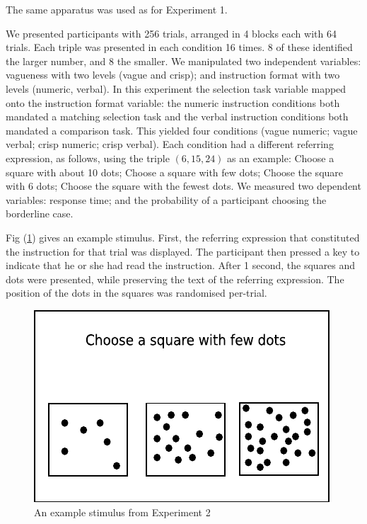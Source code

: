 \documentclass[
a4paper 
, doc
, longtable
]{apa6}
\begin{document}
The same apparatus was used as for Experiment 1.

We presented participants with 256 trials, arranged in 4 blocks each with 64 trials. Each triple was presented in each condition 16 times. 8 of these identified the larger number, and 8 the smaller. We manipulated two independent variables: vagueness with two levels (vague and crisp); and instruction format with two levels (numeric, verbal). In this experiment the selection task variable mapped onto the instruction format variable: the numeric instruction conditions both mandated a matching selection task and the verbal instruction conditions both mandated a comparison task. This yielded four conditions (vague numeric; vague verbal; crisp numeric; crisp verbal). Each condition had a different referring expression, as follows, using the triple $(6,15,24)$ as an example: Choose a square with about 10 dots; Choose a square with few dots; Choose the square with 6 dots; Choose the square with the fewest dots. We measured two dependent variables: response time; and the probability of a participant choosing the borderline case.

Fig (\ref{stimuluse2}) gives an example stimulus. First, the referring expression that constituted the instruction for that trial was displayed. The participant then pressed a key to indicate that he or she had read the instruction. After 1 second,  the squares and dots were presented, while preserving the text of the referring expression. The position of the dots in the squares was randomised per-trial.

\begin{figure}[tbp]
\centering
\includegraphics[width=.4\textwidth]{images/stimuluse2}
\caption{An example stimulus from Experiment 2}
\label{stimuluse2}
\end{figure}
\end{document}
